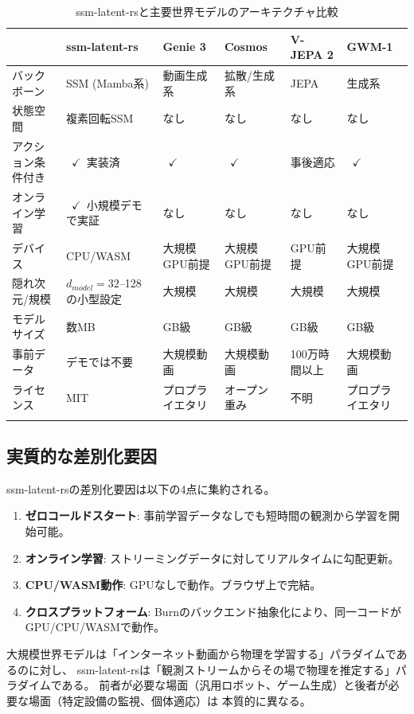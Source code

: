 \documentclass[11pt,a4paper]{ltjsarticle}
\begin{document}
{\footnotesize
\setlength{\tabcolsep}{2pt}
\begin{longtable}{p{22mm}p{25mm}p{18mm}p{20mm}p{24mm}p{24mm}}
\toprule
 & ssm-latent-rs & Genie 3 & Cosmos & V-JEPA 2 & GWM-1 \\
\midrule
\endhead
バックボーン & SSM (Mamba系) & 動画生成系 & 拡散/生成系 & JEPA & 生成系 \\
状態空間 & 複素回転SSM & なし & なし & なし & なし \\
アクション条件付き & ~$\checkmark$~実装済 & ~$\checkmark$ & ~$\checkmark$ & 事後適応 & ~$\checkmark$ \\
オンライン学習 & ~$\checkmark$~小規模デモで実証 & なし & なし & なし & なし \\
デバイス & CPU/WASM & 大規模GPU前提 & 大規模GPU前提 & GPU前提 & 大規模GPU前提 \\
隠れ次元/規模 & $d_{model}=32$--128の小型設定 & 大規模 & 大規模 & 大規模 & 大規模 \\
モデルサイズ & 数MB & GB級 & GB級 & GB級 & GB級 \\
事前データ & デモでは不要 & 大規模動画 & 大規模動画 & 100万時間以上 & 大規模動画 \\
ライセンス & MIT & プロプライエタリ & オープン重み & 不明 & プロプライエタリ \\
\bottomrule
\caption{ssm-latent-rsと主要世界モデルのアーキテクチャ比較}
\label{tab:architecture_comparison}
\end{longtable}
}

\subsection{実質的な差別化要因}

ssm-latent-rsの差別化要因は以下の4点に集約される。

\begin{enumerate}
  \item \textbf{ゼロコールドスタート}: 事前学習データなしでも短時間の観測から学習を開始可能。
  \item \textbf{オンライン学習}: ストリーミングデータに対してリアルタイムに勾配更新。
  \item \textbf{CPU/WASM動作}: GPUなしで動作。ブラウザ上で完結。
  \item \textbf{クロスプラットフォーム}: Burnのバックエンド抽象化により、同一コードがGPU/CPU/WASMで動作。
\end{enumerate}

大規模世界モデルは「インターネット動画から物理を学習する」パラダイムであるのに対し、
ssm-latent-rsは「観測ストリームからその場で物理を推定する」パラダイムである。
前者が必要な場面（汎用ロボット、ゲーム生成）と後者が必要な場面（特定設備の監視、個体適応）は
本質的に異なる。
\end{document}

